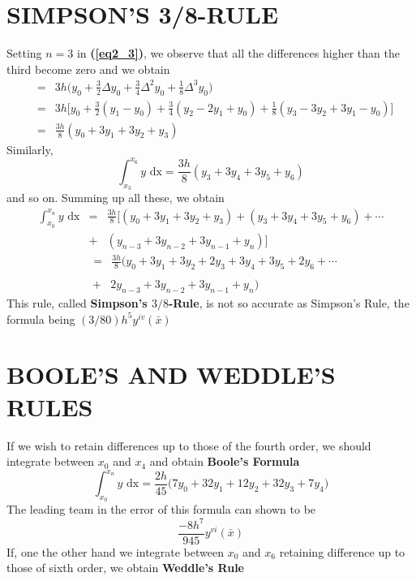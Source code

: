 \documentclass[12pt]{report}
\newcommand{\sps}{\\[0.2cm]}
\newcommand{\refn}[1]{\textbf{(\ref{#1})}}
\newcommand{\bt}[1]{\textbf{#1}}
\begin{document}
	\section{SIMPSON'S 3/8-RULE}
	Setting $n=3$ in \refn{eq2_3}, we observe that all the differences higher than the third become zero and we obtain
	\begin{eqnarray*}
		&=& 3h\big(y_0 + \frac{3}{2}\Delta y_0 + \frac{3}{4}\Delta^2 y_0 + \frac{1}{8}\Delta^3 y_0 \big) \\[0.4cm]
		&=& 3h\big[y_0 + \frac{3}{2}(y_1 -y_0) + \frac{3}{4}(y_2 - 2y_1 + y_0) + \frac{1}{8}(y_3 - 3y_2 + 3y_1 - y_0) \big] \\[0.4cm]
		&=& \frac{3h}{8}(y_0 + 3y_1 + 3y_2 + y_3)
	\end{eqnarray*}
	Similarly,
	$$
		\int_{x_3}^{x_6}y\text{ dx} = \frac{3h}{8}(y_3 + 3y_4 + 3y_5 + y_6)
	$$
	and so on. Summing up all these, we obtain
	\begin{eqnarray*}
		\int_{x_0}^{x_n}y\text{ dx} &=& \frac{3h}{8}\big[ (y_0 + 3y_1 + 3y_2 + y_3) + (y_3 + 3y_4 + 3y_5 + y_6) + \cdots \\
		&+& (y_{n-3} + 3y_{n-2} + 3y_{n-1} + y_n) \big]
	\end{eqnarray*}
	\newpage
	\begin{eqnarray*}
		&=&\frac{3h}{8}(y_0 + 3y_1 + 3y_2 + 2y_3 + 3y_4 + 3y_5 + 2y_6 + \cdots\\[-1cm]
	\end{eqnarray*}
	\begin{eqnarray}
		&+& 2y_{n-3} + 3y_{n-2} + 3y_{n-1} + y_n) \quad \quad \quad \quad \quad \quad \quad
		\label{eq3_12}
	\end{eqnarray}
	This rule, called \bt{Simpson's $3/8$-Rule}, is not so accurate as Simpson's Rule, the formula being $(3/80)h^5y^{iv}(\bar{x})$\sps
	
	\section{BOOLE'S AND WEDDLE'S RULES}
	If we wish to retain differences up to those of the fourth order, we should integrate between $x_0$ and $x_4$ and obtain \bt{Boole's Formula}
	\begin{equation}
		\int_{x_0}^{x_n}y\text{ dx} = \frac{2h}{45}\big( 7y_0 + 32y_1 + 12y_2 + 32y_3 + 7y_4\big)
		\label{eq3_13}
	\end{equation}
	The leading team in the error of this formula can shown to be 
	$$
		\frac{-8h^7}{945}y^{vi}(\bar{x})
	$$
	If, one the other hand we integrate between $x_0$ and $x_6$ retaining difference up to those of sixth order, we obtain \bt{Weddle's Rule}
	
\end{document}
